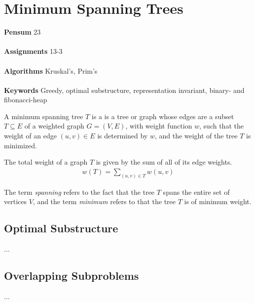 
\chapter{Minimum Spanning Trees}
\label{ch:minimumspanningtrees}

\textbf{Pensum} 23 \cite{clrs} \\\\
\textbf{Assignments} 13-3 \\\\
\textbf{Algorithms} Kruskal's, Prim's\\\\
\textbf{Keywords} Greedy, optimal substructure, representation invariant,
binary- and fibonacci-heap
\vspace{1in}

\noindent A minimum spanning tree $T$ is a is a tree or graph whose edges are
a subset $T \subseteq E$ of a weighted graph $G = (V, E)$, with weight
function $w$, such that the weight of an edge $(u, v) \in E$ is determined by
$w$, and the weight of the tree $T$ is minimized.

The total weight of a graph $T$ is given by the sum of all of its edge weights.
\begin{align}
	w(T) = \sum_{(u, v) \in T}w(u, v)
\end{align}

The term \textit{spanning} refers to the fact that the tree $T$ spans the
entire set of vertices $V$, and the term \textit{minimum} refers to that the
tree $T$ is of minimum weight.

\section{Optimal Substructure}
...

\section{Overlapping Subproblems}
...

\newpage
